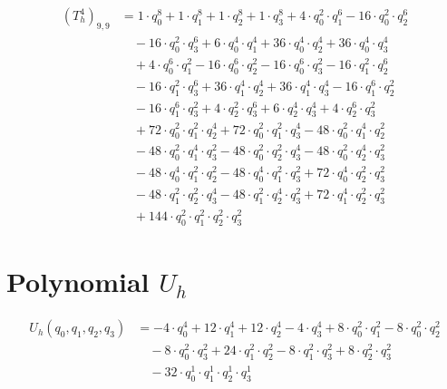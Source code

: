 \begin{align*}(T_{h}^4)_{9,9}&=1\cdot q_0^{8}+1\cdot q_1^{8}+1\cdot q_2^{8}+1\cdot q_3^{8}+4\cdot q_0^{2}\cdot q_1^{6}-16\cdot q_0^{2}\cdot q_2^{6}\\
&\quad -16\cdot q_0^{2}\cdot q_3^{6}+6\cdot q_0^{4}\cdot q_1^{4}+36\cdot q_0^{4}\cdot q_2^{4}+36\cdot q_0^{4}\cdot q_3^{4}\\
&\quad +4\cdot q_0^{6}\cdot q_1^{2}-16\cdot q_0^{6}\cdot q_2^{2}-16\cdot q_0^{6}\cdot q_3^{2}-16\cdot q_1^{2}\cdot q_2^{6}\\
&\quad -16\cdot q_1^{2}\cdot q_3^{6}+36\cdot q_1^{4}\cdot q_2^{4}+36\cdot q_1^{4}\cdot q_3^{4}-16\cdot q_1^{6}\cdot q_2^{2}\\
&\quad -16\cdot q_1^{6}\cdot q_3^{2}+4\cdot q_2^{2}\cdot q_3^{6}+6\cdot q_2^{4}\cdot q_3^{4}+4\cdot q_2^{6}\cdot q_3^{2}\\
&\quad +72\cdot q_0^{2}\cdot q_1^{2}\cdot q_2^{4}+72\cdot q_0^{2}\cdot q_1^{2}\cdot q_3^{4}-48\cdot q_0^{2}\cdot q_1^{4}\cdot q_2^{2}\\
&\quad -48\cdot q_0^{2}\cdot q_1^{4}\cdot q_3^{2}-48\cdot q_0^{2}\cdot q_2^{2}\cdot q_3^{4}-48\cdot q_0^{2}\cdot q_2^{4}\cdot q_3^{2}\\
&\quad -48\cdot q_0^{4}\cdot q_1^{2}\cdot q_2^{2}-48\cdot q_0^{4}\cdot q_1^{2}\cdot q_3^{2}+72\cdot q_0^{4}\cdot q_2^{2}\cdot q_3^{2}\\
&\quad -48\cdot q_1^{2}\cdot q_2^{2}\cdot q_3^{4}-48\cdot q_1^{2}\cdot q_2^{4}\cdot q_3^{2}+72\cdot q_1^{4}\cdot q_2^{2}\cdot q_3^{2}\\
&\quad +144\cdot q_0^{2}\cdot q_1^{2}\cdot q_2^{2}\cdot q_3^{2}\end{align*}
\section{Polynomial $U_h$}
\begin{align*}U_h(q_0,q_1,q_2,q_3)&=-4\cdot q_0^{4}+12\cdot q_1^{4}+12\cdot q_2^{4}-4\cdot q_3^{4}+8\cdot q_0^{2}\cdot q_1^{2}-8\cdot q_0^{2}\cdot q_2^{2}\\
&\quad -8\cdot q_0^{2}\cdot q_3^{2}+24\cdot q_1^{2}\cdot q_2^{2}-8\cdot q_1^{2}\cdot q_3^{2}+8\cdot q_2^{2}\cdot q_3^{2}\\
&\quad -32\cdot q_0^{1}\cdot q_1^{1}\cdot q_2^{1}\cdot q_3^{1}\end{align*}

